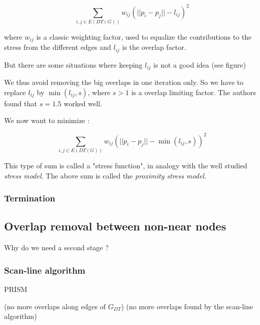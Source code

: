 \documentclass[12pt]{report}
\begin{document}
\[ \sum_{i,j \in E(DT(G))} w_{ij}(||p_i - p_j|| - l_{ij})^2\]

where $w_{ij}$ is a classic weighting factor, used to equalize the contributions to the stress from the different edges and $l_{ij}$ is the overlap factor.

But there are some situations where keeping $l_{ij}$ is not a good idea (see figure) %

We thus avoid removing the big overlaps in one iteration only.
So we have to replace $l_{ij}$ by $\min(l_{ij},s)$, where $s > 1$ is a overlap limiting factor. The authors found that $s = 1.5$ worked well.

We now want to minimize :

\[ \sum_{i,j \in E(DT(G))} w_{ij}(||p_i - p_j|| - \min(l_{ij},s))^2\]

This type of sum is called a "stress function", in analogy with the well studied \emph{stress model}. %
The above sum is called the \emph{proximity stress model}.


\bigskip


\subsubsection{Termination}

\subsection{Overlap removal between non-near nodes}

Why do we need a second stage ?
\subsubsection{Scan-line algorithm}

\bigskip
\begin{algorithm}[H]
\caption{PRISM}
	 
(no more overlaps along edges of $G_{DT}$)
\BlankLine
{}	
(no more overlaps found by the scan-line algorithm)
\end{algorithm}
\end{document}
